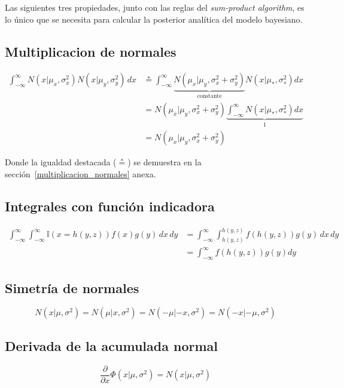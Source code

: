 \documentclass[article]{jss}
\begin{document}
\begin{appendix}
Las siguientes tres propiedades, junto con las reglas del \emph{sum-product algorithm}, es lo \'unico que se necesita para calcular la posterior anal\'itica del modelo bayesiano.

\subsection*{Multiplicacion de normales}  
\begin{equation}\label{eq:multiplicacion_normales}
\begin{split}
 \int_{-\infty}^{\infty} N(x|\mu_x,\sigma_x^2)N(x|\mu_y,\sigma_y^2) \, dx  &  \overset{*}{=} \int_{-\infty}^{\infty}  \underbrace{N(\mu_x|\mu_y,\sigma_x^2+\sigma_y^2)}_{\text{constante}} N(x|\mu_{*},\sigma_{*}^2) dx \\
 & = N(\mu_x|\mu_y,\sigma_x^2+\sigma_y^2) \underbrace{\int_{-\infty}^{\infty}  N(x|\mu_{*},\sigma_{*}^2) dx}_{1} \\
 & = N(\mu_x|\mu_y,\sigma_x^2+\sigma_y^2) 
\end{split}
\end{equation}

Donde la igualdad destacada ($\overset{*}{=}$) se demuestra en la secci\'on~\ref{multiplicacion_normales} anexa.

\subsection*{Integrales con funci\'on indicadora}
\begin{equation}\label{eq:integral_con_indicadora} 
\begin{split}
 \int_{-\infty}^{\infty}  \int_{-\infty}^{\infty}  \mathbb{I}(x=h(y,z)) f(x) g(y)\, dx\, dy &=  \int_{-\infty}^{\infty} \int_{h(y,z)}^{h(y,z)} f(h(y,z)) g(y)\, dx\, dy\\
 & = \int_{-\infty}^{\infty} f(h(y,z)) g(y) dy 
\end{split}
\end{equation}

\subsection*{Simetr\'ia de normales}
\begin{equation}\label{eq:simetria}
 N(x|\mu,\sigma^2) = N(\mu|x,\sigma^2) = N(-\mu|-x,\sigma^2) = N(-x|-\mu,\sigma^2) 
\end{equation}

\subsection*{Derivada de la acumulada normal}
\begin{equation}\label{eq:phi_norm}
 \frac{\partial}{\partial x} \Phi(x|\mu,\sigma^2) = N(x|\mu,\sigma^2)
\end{equation}


\end{appendix}
\end{document}
